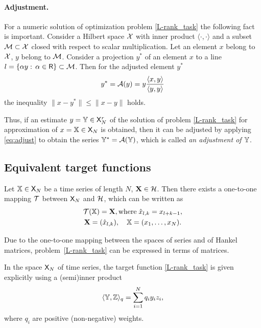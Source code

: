 \documentclass[sii]{ipart}
\begin{document}
\paragraph*{Adjustment.} For a numeric solution of optimization problem \eqref{L-rank_task} the following fact is important.
Consider a Hilbert space $\mathcal{X}$ with inner product $\langle\cdot, \cdot\rangle$ and a subset $\mathcal{M} \subset \mathcal{X}$ closed with respect to scalar multiplication. Let an element $x$ belong to $\mathcal{X}$, $y$ belong to $\mathcal{M}$. Consider a projection $y^*$ of an element $x$ to a line $l = \{\alpha y:\, \alpha \in \mathsf{R}\}\subset \mathcal{M}$. Then for the adjusted element $y^*$
\begin{equation}
\label{eq:adjust}
y^* = \calA(y)= y \frac{\langle x, y\rangle}{\langle y, y\rangle}
\end{equation}
the inequality $\|x - y^*\| \le \|x - y\|$ holds.

Thus, if an estimate $y=\mathbb{Y} \in \mathsf{X}_N^r$ of the solution of problem \eqref{L-rank_task} for approximation of $x=\mathbb{X} \in \mathsf{X}_N$ is obtained, then it can be adjusted by applying \eqref{eq:adjust} to obtain the series $\mathbb{Y}^*=\mathcal{A}(\mathbb{Y})$, which is called \emph{an adjustment of $\mathbb{Y}$}.

\subsection{Equivalent target functions}

Let $\mathbb{X} \in \mathsf{X}_N$ be a time series of length $N$, $\mathbf{X} \in \mathcal{H}$. Then there exists a one-to-one mapping $\mathcal{T}$ between $\mathsf{X}_N$ and $\mathcal{H}$, which can be written as
\begin{multline*}
\calT(\tsX) = \bfX, \text{where} \; \hat x_{l, k} = x_{l + k - 1}, \\ \bfX = (\hat x_{l,k}), \quad \tsX = (x_1, \ldots, x_N).
\end{multline*}

Due to the one-to-one mapping between the spaces of series and of Hankel matrices, problem~\eqref{L-rank_task} can be expressed in terms of matrices.

In the space $\mathsf{X}_N$ of time series, the target function \eqref{L-rank_task} is given explicitly using a (semi)inner product
\begin{equation}
\label{eq:norm_ser}
\langle\tsY,\tsZ\rangle_q = \sum_{i = 1}^N q_i y_i z_i,
\end{equation}
where $q_i$ are positive (non-negative) weights.
\end{document}
